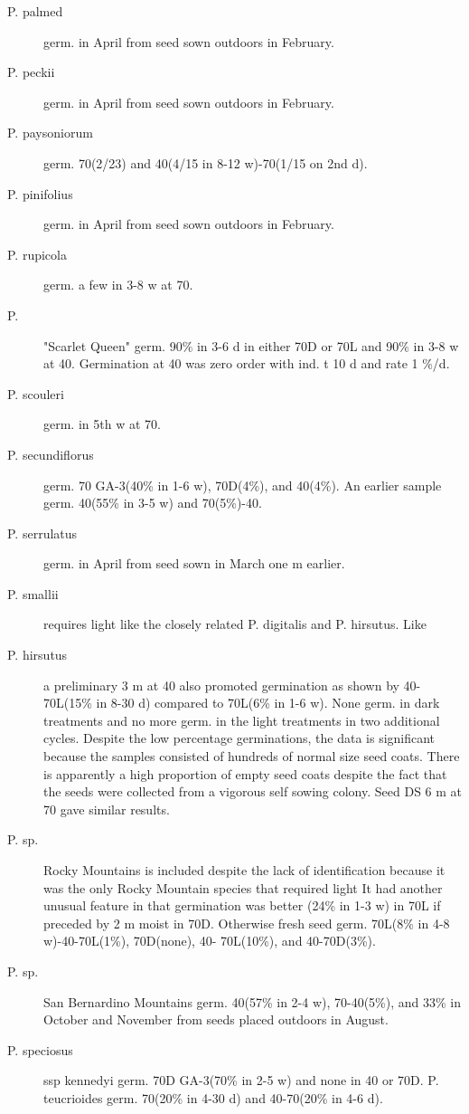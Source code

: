 \begin{description}
\item[P. palmed] germ. in April from seed sown outdoors in February.
\item[P. peckii] germ. in April from seed sown outdoors in February.
\item[P. paysoniorum] germ. 70(2/23) and 40(4/15 in 8-12 w)-70(1/15 on 2nd d).
\item[P. pinifolius] germ. in April from seed sown outdoors in February.
\item[P. rupicola] germ. a few in 3-8 w at 70.
\item[P. ]"Scarlet Queen" germ. 90\% in 3-6 d in either 70D or 70L and 90\% in
3-8 w at 40. Germination at 40 was zero order with ind. t 10 d and rate 1 \%/d.
\item[P. scouleri] germ. in 5th w at 70.
\item[P. secundiflorus] germ. 70 GA-3(40\% in 1-6 w), 70D(4\%), and 40(4\%). An
earlier sample germ. 40(55\% in 3-5 w) and 70(5\%)-40.
\item[P. serrulatus] germ. in April from seed sown in March one m earlier.
\item[P. smallii] requires light like the closely related P. digitalis and P. hirsutus. Like
\item[P. hirsutus] a preliminary 3 m at 40 also promoted germination as shown by 40-
70L(15\% in 8-30 d) compared to 70L(6\% in 1-6 w). None germ. in dark treatments
and no more germ. in the light treatments in two additional cycles. Despite the low
percentage germinations, the data is significant because the samples consisted of
hundreds of normal size seed coats. There is apparently a high proportion of empty
seed coats despite the fact that the seeds were collected from a vigorous self sowing
colony. Seed DS 6 m at 70 gave similar results.
\item[P. sp.] Rocky Mountains is included despite the lack of identification because it
was the only Rocky Mountain species that required light It had another unusual
feature in that germination was better (24\% in 1-3 w) in 70L if preceded by 2 m moist in
70D. Otherwise fresh seed germ. 70L(8\% in 4-8 w)-40-70L(1\%), 70D(none), 40-
70L(10\%), and 40-70D(3\%).
\item[P. sp.] San Bernardino Mountains germ. 40(57\% in 2-4 w), 70-40(5\%), and 33\%
in October and November from seeds placed outdoors in August.
\item[P. speciosus] ssp kennedyi germ. 70D GA-3(70\% in 2-5 w) and none in 40 or
70D. P. teucrioides germ. 70(20\% in 4-30 d) and 40-70(20\% in 4-6 d).

\end{description}
